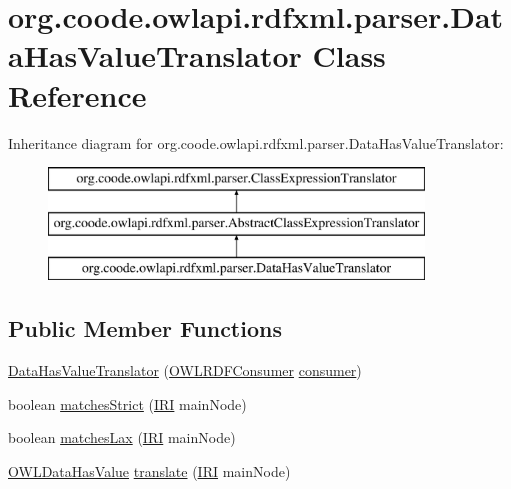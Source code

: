 \hypertarget{classorg_1_1coode_1_1owlapi_1_1rdfxml_1_1parser_1_1_data_has_value_translator}{\section{org.\-coode.\-owlapi.\-rdfxml.\-parser.\-Data\-Has\-Value\-Translator Class Reference}
\label{classorg_1_1coode_1_1owlapi_1_1rdfxml_1_1parser_1_1_data_has_value_translator}
}
Inheritance diagram for org.\-coode.\-owlapi.\-rdfxml.\-parser.\-Data\-Has\-Value\-Translator\-:\begin{figure}[H]
\begin{center}
\leavevmode
\includegraphics[height=3.000000cm]{classorg_1_1coode_1_1owlapi_1_1rdfxml_1_1parser_1_1_data_has_value_translator}
\end{center}
\end{figure}
\subsection*{Public Member Functions}
\begin{DoxyCompactItemize}
\item 
\hyperlink{classorg_1_1coode_1_1owlapi_1_1rdfxml_1_1parser_1_1_data_has_value_translator_ab23bf94a27c67ebcd926efee06a56ad8}{Data\-Has\-Value\-Translator} (\hyperlink{classorg_1_1coode_1_1owlapi_1_1rdfxml_1_1parser_1_1_o_w_l_r_d_f_consumer}{O\-W\-L\-R\-D\-F\-Consumer} \hyperlink{classorg_1_1coode_1_1owlapi_1_1rdfxml_1_1parser_1_1_abstract_class_expression_translator_ae547084cdd5b92c03835b5aa404f823b}{consumer})
\item 
boolean \hyperlink{classorg_1_1coode_1_1owlapi_1_1rdfxml_1_1parser_1_1_data_has_value_translator_ab0091c8bb74619b59b87258035fe7f0c}{matches\-Strict} (\hyperlink{classorg_1_1semanticweb_1_1owlapi_1_1model_1_1_i_r_i}{I\-R\-I} main\-Node)
\item 
boolean \hyperlink{classorg_1_1coode_1_1owlapi_1_1rdfxml_1_1parser_1_1_data_has_value_translator_a285b4d39944f358aef33936ac04fe4bb}{matches\-Lax} (\hyperlink{classorg_1_1semanticweb_1_1owlapi_1_1model_1_1_i_r_i}{I\-R\-I} main\-Node)
\item 
\hyperlink{interfaceorg_1_1semanticweb_1_1owlapi_1_1model_1_1_o_w_l_data_has_value}{O\-W\-L\-Data\-Has\-Value} \hyperlink{classorg_1_1coode_1_1owlapi_1_1rdfxml_1_1parser_1_1_data_has_value_translator_a135e77279958be8fa8409a3f82823bce}{translate} (\hyperlink{classorg_1_1semanticweb_1_1owlapi_1_1model_1_1_i_r_i}{I\-R\-I} main\-Node)
\end{DoxyCompactItemize}
